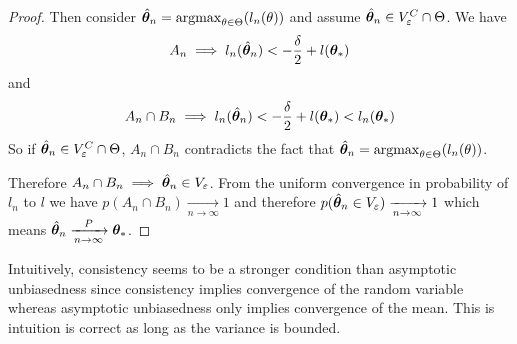 \begin{proof}
  Then consider $\hat{\boldsymbol{\theta}}_n = \operatorname*{argmax}_{\theta \in
    \Theta}(l_n(\theta))$ and assume $\hat{\boldsymbol{\theta}}_n \in V_{\varepsilon}^C \cap \Theta$.
  We have
  \begin{align}
  A_n
    \implies l_n(\hat{\boldsymbol{\theta}}_n) < -\frac{\delta}{2} + l(\boldsymbol{\theta}_*)
  \end{align}
  and 
  \begin{align}
    A_n \cap B_n \implies l_n(\hat{\boldsymbol{\theta}}_n) < -\frac{\delta}{2} + l(\boldsymbol{\theta}_*) < l_n(\boldsymbol{\theta}_*)
  \end{align}
  So if $\hat{\boldsymbol{\theta}}_n \in V_{\varepsilon}^C \cap \Theta$, $A_n \cap B_n$ contradicts the fact that $\hat{\boldsymbol{\theta}}_n = \operatorname*{argmax}_{\theta \in
    \Theta}(l_n(\theta))$.

  Therefore $A_n \cap B_n \implies \hat{\boldsymbol{\theta}}_n \in V_{\varepsilon} $.
  From the uniform convergence in probability of $l_n$ to $l$ we have
  $p(A_n \cap B_n) \xrightarrow[n \rightarrow \infty]{} 1$ and therefore
  $p(\hat{\boldsymbol{\theta}}_n \in V_{\varepsilon}) \xrightarrow[n \rightarrow \infty]{} 1$ which
  means $\hat{\boldsymbol{\theta}}_n \xrightarrow[n \rightarrow \infty]{P} \boldsymbol{\theta}_*$.
\end{proof}

Intuitively, consistency  seems to be a stronger condition than asymptotic
unbiasedness since consistency implies convergence of the random variable whereas
asymptotic unbiasedness only implies convergence of the mean.
This is intuition is correct as long as the variance is bounded.

